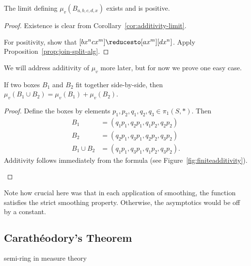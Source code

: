 \begin{proposition}
  The limit defining $\mu_{v}(B_{a,b,c,d,x})$ exists and is positive.
\end{proposition}

\begin{proof}
  Existence is clear from Corollary~\ref{cor:additivity-limit}.

  For positivity, show that $[b x^n c x^m] \reducesto [a x^m][d x^n]$.
  Apply Proposition~\ref{prop:join-split-alg}.
\end{proof}

We will address additivity of $\mu_v$ more later, but for now we prove
one easy case.

\begin{proposition}
  If two boxes $B_1$ and $B_2$ fit together side-by-side, then
  $\mu_v(B_1 \cup B_2) = \mu_v(B_1) + \mu_v(B_2)$.
\end{proposition}

\begin{proof}
  Define the boxes by elements $p_1,p_2,q_1,q_2,q_3 \in \pi_1(S, *)$.
  Then
  \begin{align*}
    B_1 &= (q_1 p_1, q_2 p_1, q_1 p_2, q_2 p_2)\\
    B_2 &= (q_2 p_1, q_3 p_1, q_2 p_2, q_3 p_2)\\
    B_1 \cup B_2 &= (q_1 p_1, q_3 p_1, q_1 p_2, q_3 p_2).
  \end{align*}
  Additivity follows immediately from the formula (see Figure~\ref{fig:finiteadditivity}).
  
  \begin{figure}
\end{figure}
\end{proof}

\begin{remark}
Note how crucial here was that in each application of smoothing, the function satisfies the strict smoothing property. Otherwise, the asymptotics would be off by a constant.
\end{remark}

\subsection{Carathéodory's Theorem}
\label{sec:caratheodry}

\begin{definition}
semi-ring in measure theory
\end{definition}

